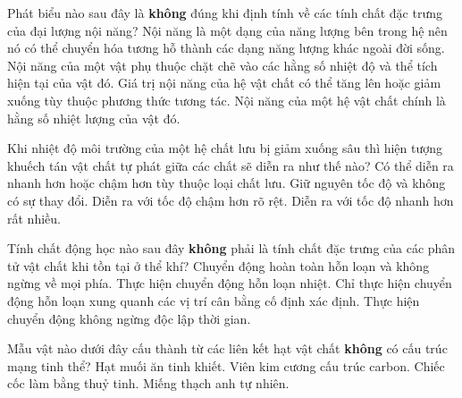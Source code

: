 \begin{ex}%
	Phát biểu nào sau đây là \textbf{không} đúng khi định tính về các tính chất đặc trưng của đại lượng nội năng?
	\choice
	{Nội năng là một dạng của năng lượng bên trong hệ nên nó có thể chuyển hóa tương hỗ thành các dạng năng lượng khác ngoài đời sống.}
	{Nội năng của một vật phụ thuộc chặt chẽ vào các hằng số nhiệt độ và thể tích hiện tại của vật đó.}
	{Giá trị nội năng của hệ vật chất có thể tăng lên hoặc giảm xuống tùy thuộc phương thức tương tác.}
	{\True Nội năng của một hệ vật chất chính là hằng số nhiệt lượng của vật đó.}
\end{ex}

\begin{ex}%
	Khi nhiệt độ môi trường của một hệ chất lưu bị giảm xuống sâu thì hiện tượng khuếch tán vật chất tự phát giữa các chất sẽ diễn ra như thế nào?
	\choice
	{Có thể diễn ra nhanh hơn hoặc chậm hơn tùy thuộc loại chất lưu.}
	{Giữ nguyên tốc độ và không có sự thay đổi.}
	{\True Diễn ra với tốc độ chậm hơn rõ rệt.}
	{Diễn ra với tốc độ nhanh hơn rất nhiều.}
\end{ex}

\begin{ex}%
	Tính chất động học nào sau đây \textbf{không} phải là tính chất đặc trưng của các phân tử vật chất khi tồn tại ở thể khí?
	\choice
	{Chuyển động hoàn toàn hỗn loạn và không ngừng về mọi phía.}
	{Thực hiện chuyển động hỗn loạn nhiệt.}
	{\True Chỉ thực hiện chuyển động hỗn loạn xung quanh các vị trí cân bằng cố định xác định.}
	{Thực hiện chuyển động không ngừng độc lập thời gian.}
\end{ex}

\begin{ex}%
	Mẫu vật nào dưới đây cấu thành từ các liên kết hạt vật chất \textbf{không} có cấu trúc mạng tinh thể?
	\choice
	{Hạt muối ăn tinh khiết.}
	{Viên kim cương cấu trúc carbon.}
	{\True Chiếc cốc làm bằng thuỷ tinh.}
	{Miếng thạch anh tự nhiên.}
\end{ex}

